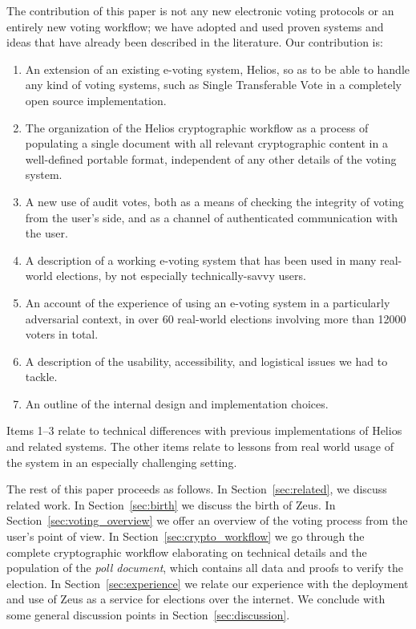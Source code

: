 \documentclass[jets]{usenixjournal}
\begin{document}
The contribution of this paper is not any new electronic voting
protocols or an entirely new voting workflow; we have adopted and used
proven systems and ideas that have already been described in the
literature. Our contribution is:
\begin{enumerate}
\item An extension of an existing e-voting system, Helios, so as to be
  able to handle any kind of voting systems, such as Single
  Transferable Vote in a completely open source implementation.
\item The organization of the Helios cryptographic workflow as a
  process of populating a single document with all relevant
  cryptographic content in a well-defined portable format,
  independent of any other details of the voting system.
\item A new use of audit votes, both as a means of checking the
  integrity of voting from the user's side, and as a channel of
  authenticated communication with the user.
\item A description of a working e-voting system that has been used in
  many real-world elections, by not especially technically-savvy
  users.
\item An account of the experience of using an e-voting system in a
  particularly adversarial context, in over 60 real-world elections
  involving more than 12000 voters in total.
\item A description of the usability, accessibility, and logistical
  issues we had to tackle.
\item An outline of the internal design and implementation choices.
\end{enumerate}

Items 1--3 relate to technical differences with previous
implementations of Helios and related systems. The other items relate
to lessons from real world usage of the system in an especially
challenging setting.

The rest of this paper proceeds as follows. In
Section~\ref{sec:related}, we discuss related work. In
Section~\ref{sec:birth} we discuss the birth of Zeus. In
Section~\ref{sec:voting_overview} we offer an overview of the voting
process from the user's point of view. In
Section~\ref{sec:crypto_workflow} we go through the complete
cryptographic workflow elaborating on technical details and the
population of the \emph{poll document}, which contains all data and
proofs to verify the election. In Section~\ref{sec:experience} we
relate our experience with the deployment and use of Zeus as a service
for elections over the internet. We conclude with some general
discussion points in Section~\ref{sec:discussion}.
\end{document}
